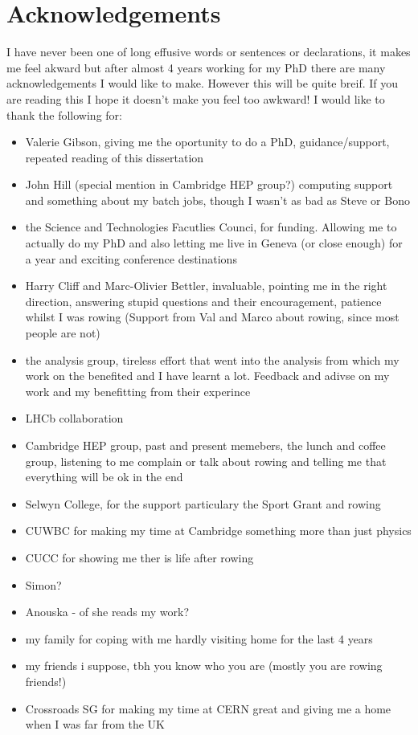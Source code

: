 




\chapter{Acknowledgements}

I have never been one of long effusive words or sentences or declarations, it makes me feel akward but after almost 4 years working for my PhD there are many acknowledgements I would like to make. However this will be quite breif. If you are reading this I hope it doesn't make you feel too awkward!
I would like to thank the following for:
\begin{itemize}
\item Valerie Gibson, giving me the oportunity to do a PhD, guidance/support, repeated reading of this dissertation
\item John Hill (special mention in Cambridge HEP group?) computing support and something about my batch jobs, though I wasn't as bad as Steve or Bono
\item the Science and Technologies Facutlies Counci, for funding. Allowing me to actually do my PhD and also letting me live in Geneva (or close enough) for a year and exciting conference destinations
\item Harry Cliff and Marc-Olivier Bettler, invaluable, pointing me in the right direction, answering stupid questions and their encouragement, patience whilst I was rowing (Support from Val and Marco about rowing, since most people are not)
\item the \bmumu analysis group, tireless effort that went into the \BF analysis from which my work on the \el benefited and I have learnt a lot. Feedback and adivse on my work and my benefitting from their experince
\item LHCb collaboration
\item Cambridge HEP group, past and present memebers, the lunch and coffee group, listening to me complain or talk about rowing and telling me that everything will be ok in the end
\item Selwyn College, for the support particulary the Sport Grant and rowing
\item CUWBC for making my time at Cambridge something more than just physics
\item CUCC for showing me ther is life after rowing
\item Simon?
\item Anouska - of she reads my work?
\item my family for coping with me hardly visiting home for the last 4 years
\item my friends i suppose, tbh you know who you are (mostly you are rowing friends!)
\item Crossroads SG for making my time at CERN great and giving me a home when I was far from the UK
\end{itemize}
